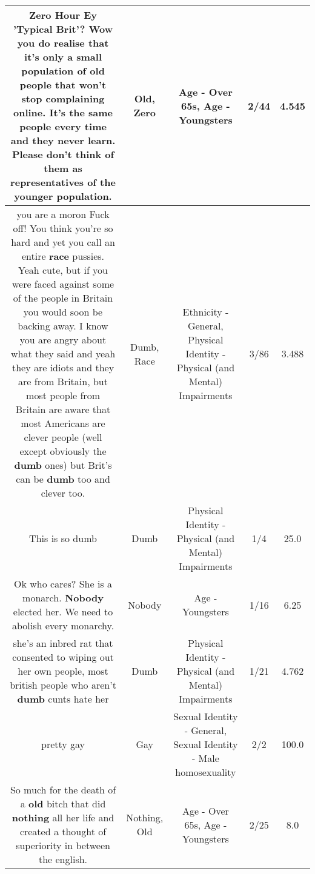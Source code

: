 \documentclass[11pt]{article}
\newlength\mylength
\begin{document}
\begin{center}
\begin{longtable}{|C{.65\mylength}|C{.30\mylength}|C{.12\mylength}|C{.12\mylength}|C{.12\mylength}|}
  \small Zero Hour Ey 'Typical Brit'? Wow you do realise that it's only a small population of \textbf{old} people that won't stop complaining online. It's the same people every time and they never learn. Please don't think of them as representatives of the younger population.\normalsize   & Old, Zero & Age - Over 65s, Age - Youngsters & 2/44 & 4.545 \\  \hline
  \small you are a moron Fuck off! You think you're so hard and yet you call an entire \textbf{race} pussies. Yeah cute, but if you were faced against some of the people in Britain you would soon be backing away. I know you are angry about what they said and yeah they are idiots and they are from Britain, but most people from Britain are aware that most Americans are clever people (well except obviously the \textbf{dumb} ones) but Brit's can be \textbf{dumb} too and clever too.\normalsize   & Dumb, Race & Ethnicity - General, Physical Identity - Physical (and Mental) Impairments & 3/86 & 3.488 \\  \hline
  \small This is so dumb\normalsize   & Dumb & Physical Identity - Physical (and Mental) Impairments & 1/4 & 25.0 \\  \hline
  \small Ok who cares? She is a monarch. \textbf{Nobody} elected her. We need to abolish every monarchy.\normalsize   & Nobody & Age - Youngsters & 1/16 & 6.25 \\  \hline
  \small she's an inbred rat that consented to wiping out her own people, most british people who aren't \textbf{dumb} cunts hate her\normalsize   & Dumb & Physical Identity - Physical (and Mental) Impairments & 1/21 & 4.762 \\  \hline
  \small pretty gay\normalsize   & Gay & Sexual Identity - General, Sexual Identity - Male homosexuality & 2/2 & 100.0 \\  \hline
  \small So much for the death of a \textbf{old} bitch that did \textbf{nothing} all her life and created a thought of superiority in between the english.\normalsize   & Nothing, Old & Age - Over 65s, Age - Youngsters & 2/25 & 8.0 \\  \hline

\end{longtable}
\end{center}
\end{document}
